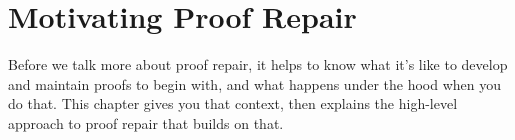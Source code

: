 \chapter{Motivating Proof Repair}

Before we talk more about proof repair, it helps to know what it's like to develop and maintain proofs to begin with, and what happens under the hood when you do that. This chapter gives you that context, then explains the high-level approach to proof repair that builds on that.






